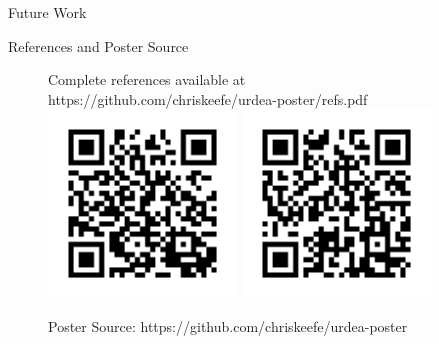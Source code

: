 \documentclass[final]{beamer}
\newlength{\sepwidth}
\newlength{\colwidth}
\newcommand{\separatorcolumn}{\begin{column}{\sepwidth}\end{column}}
\begin{document}
\begin{frame}[t]
\begin{columns}[t]
\begin{column}{\colwidth}
\begin{block}{Future Work}
  \end{block}

  \begin{block}{References and Poster Source}
    \nocite{*}
    
    \begin{figure}
      \begin{minipage}[c]{\textwidth}
        Complete references available at https://github.com/chriskeefe/urdea-poster/refs.pdf
        \newline
        \includegraphics[height=5cm]{assets/refs_qr.png}
        \hfill
        \includegraphics[height=5cm]{assets/repo}
      \end{minipage}
      \begin{minipage}[c]{\textwidth}
        \hfill
        Poster Source: https://github.com/chriskeefe/urdea-poster
      \end{minipage}
    \end{figure}
    
  \end{block}

\end{column}

\separatorcolumn
\end{columns}
\end{frame}
\end{document}
